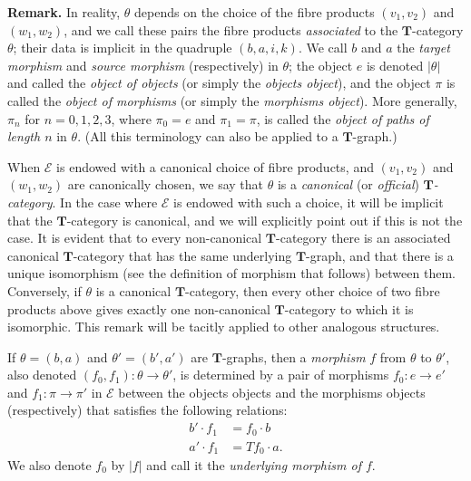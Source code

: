 \documentclass[fleqn]{article}
\newenvironment{rmenv}[1]
  {\phantomsection\par\medskip\noindent\textbf{#1.}\rmfamily}
  {\par\medskip}
\newcommand{\oldpage}[1]{\marginpar{\footnotesize$\Big\vert$ \textit{p.~#1}}}
\newcommand{\TT}{\mathbf{T}}
\newcommand{\cat}[1]{\mathcal{#1}}
\newcommand{\set}[1]{|#1|}
\begin{document}
\begin{rmenv}{Remark}
  \oldpage{227}
  In reality, $\theta$ depends on the choice of the fibre products $(v_1,v_2)$ and $(w_1,w_2)$, and we call these pairs the fibre products \emph{associated} to the $\TT$-category $\theta$;
  their data is implicit in the quadruple $(b,a,i,k)$.
  We call $b$ and $a$ the \emph{target morphism} and \emph{source morphism} (respectively) in $\theta$;
  the object $e$ is denoted $\set{\theta}$ and called the \emph{object of objects} (or simply the \emph{objects object}), and the object $\pi$ is called the \emph{object of morphisms} (or simply the \emph{morphisms object}).
  More generally, $\pi_n$ for $n=0,1,2,3$, where $\pi_0=e$ and $\pi_1=\pi$, is called the \emph{object of paths of length $n$} in $\theta$.
  (All this terminology can also be applied to a $\TT$-graph.)

  When $\cat{E}$ is endowed with a canonical choice of fibre products, and $(v_1,v_2)$ and $(w_1,w_2)$ are canonically chosen, we say that $\theta$ is a \emph{canonical} (or \emph{official}) \emph{$\TT$-category}.
  In the case where $\cat{E}$ is endowed with such a choice, it will be implicit that the $\TT$-category is canonical, and we will explicitly point out if this is not the case.
  It is evident that to every non-canonical $\TT$-category there is an associated canonical $\TT$-category that has the same underlying $\TT$-graph, and that there is a unique isomorphism (see the definition of morphism that follows) between them.
  Conversely, if $\theta$ is a canonical $\TT$-category, then every other choice of two fibre products above gives exactly one non-canonical $\TT$-category to which it is isomorphic.
  This remark will be tacitly applied to other analogous structures.
\end{rmenv}

If $\theta=(b,a)$ and $\theta'=(b',a')$ are $\TT$-graphs, then a \emph{morphism} $f$ from $\theta$ to $\theta'$, also denoted $(f_0,f_1)\colon\theta\to\theta'$, is determined by a pair of morphisms $f_0\colon e\to e'$ and $f_1\colon\pi\to\pi'$ in $\cat{E}$ between the objects objects and the morphisms objects (respectively) that satisfies the following relations:
\[
  \begin{aligned}
    b'\cdot f_1
    &= f_0\cdot b
  \\a'\cdot f_1
    &= Tf_0\cdot a.
  \end{aligned}
  \tag{1'}
\]
We also denote $f_0$ by $\set{f}$ and call it the \emph{underlying morphism of $f$}.
\end{document}
